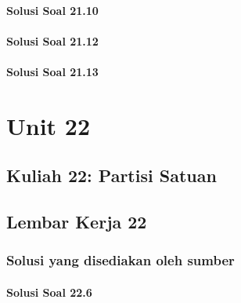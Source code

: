 \documentclass[11pt,a4paper,oneside]{book}
\begin{document}
\subsection*{Solusi Soal 21.10}

\subsection*{Solusi Soal 21.12}

\subsection*{Solusi Soal 21.13}


\part{Unit 22}
\chapter[Kuliah 22]{Kuliah 22: Partisi Satuan}


\chapter{Lembar Kerja 22}


\section*{Solusi yang disediakan oleh sumber}
\subsection*{Solusi Soal 22.6}


\backmatter
\listoffigures
\end{document}
